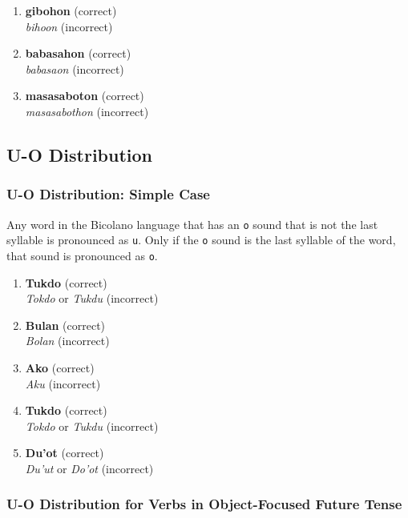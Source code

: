 \begin{enumerate}
      \item \textbf{gibohon} (correct) \\
            \textit{bihoon} (incorrect)
      \item \textbf{babasahon} (correct) \\
            \textit{babasaon} (incorrect)
      \item \textbf{masasaboton} (correct) \\
            \textit{masasabothon} (incorrect)
\end{enumerate}

\subsection{U-O Distribution}

\subsubsection{U-O Distribution: Simple Case}
Any word in the Bicolano language that has an \texttt{o} sound that is not the last syllable is pronounced as \texttt{u}. Only if the \texttt{o} sound is the last syllable of the word, that sound is pronounced as \texttt{o}.

\begin{example}
\end{example}

\begin{enumerate}
      \item \textbf{Tukdo} (correct) \\
            \textit{Tokdo} or \textit{Tukdu} (incorrect) 
      \item \textbf{Bulan} (correct) \\
            \textit{Bolan} (incorrect) 
      \item \textbf{Ako} (correct) \\
            \textit{Aku} (incorrect) 
      \item \textbf{Tukdo} (correct) \\
            \textit{Tokdo} or \textit{Tukdu} (incorrect) 
      \item \textbf{Du'ot} (correct) \\
            \textit{Du'ut} or \textit{Do'ot} (incorrect) 
\end{enumerate}

\subsubsection{U-O Distribution for Verbs in Object-Focused Future Tense}

